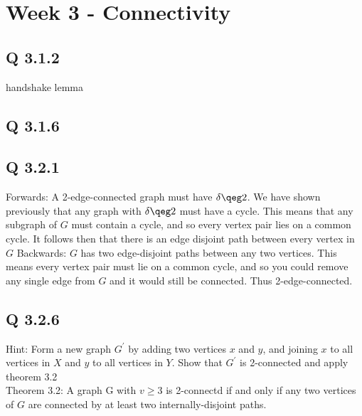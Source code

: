

\chapter[Week 3 - Connectivity]{Week 3 - Connectivity}

\section{Q 3.1.2}
handshake lemma

\section{Q 3.1.6}

\section{Q 3.2.1}
Forwards: A 2-edge-connected graph must have $\delta \qeg 2$. We have shown previously that any graph with $\delta \qeg 2$ must have a cycle. This means that any subgraph of $G$ must contain a cycle, and so every vertex pair lies on a common cycle. It follows then that there is an edge disjoint path between every vertex in $G$
Backwards: $G$ has two edge-disjoint paths between any two vertices. This means every vertex pair must lie on a common cycle, and so you could remove any single edge from $G$ and it would still be connected. Thus 2-edge-connected.

\section{Q 3.2.6}
Hint: Form a new graph $G^\prime$ by adding two vertices $x$ and $y$, and joining $x$ to all vertices in $X$ and $y$ to all vertices in $Y$. Show that $G^\prime$ is 2-connected and apply theorem 3.2\\
Theorem 3.2: A graph G with $v \geq 3$ is 2-connectd if and only if any two vertices of $G$ are connected by at least two internally-disjoint paths.\\

